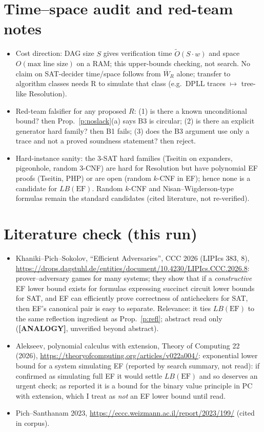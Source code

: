 \documentclass[11pt]{article}
\theoremstyle{remark}
\newcommand{\status}[1]{\textbf{[#1]}}
\newcommand{\W}{\overline W}
\begin{document}
\section{Time--space audit and red-team notes}
\begin{itemize}
\item Cost direction: DAG size $S$ gives verification time $\widetilde O(S\cdot w)$ and space $O(\text{max line size})$ on a RAM; this upper-bounds checking, not search. No claim on SAT-decider time/space follows from $\W_R$ alone; transfer to algorithm classes needs R to simulate that class (e.g.\ DPLL traces $\mapsto$ tree-like Resolution).
\item Red-team falsifier for any proposed $R$: (1) is there a known unconditional bound? then Prop.~\ref{p:noslack}(a) says B3 is circular; (2) is there an explicit generator hard family? then B1 fails; (3) does the B3 argument use only a trace and not a proved soundness statement? then reject.
\item Hard-instance sanity: the 3-SAT hard families (Tseitin on expanders, pigeonhole, random 3-CNF) are hard for Resolution but have polynomial EF proofs (Tseitin, PHP) or are open (random $k$-CNF in EF); hence none is a candidate for $LB(\mathrm{EF})$. Random $k$-CNF and Nisan--Wigderson-type formulas remain the standard candidates (cited literature, not re-verified).
\end{itemize}

\section{Literature check (this run)}
\begin{itemize}
\item Khaniki--Pich--Sokolov, ``Efficient Adversaries'', CCC 2026 (LIPIcs 383, 8), \url{https://drops.dagstuhl.de/entities/document/10.4230/LIPIcs.CCC.2026.8}: prover--adversary games for many systems; they show that if a \emph{constructive} EF lower bound exists for formulas expressing succinct circuit lower bounds for SAT, and EF can efficiently prove correctness of anticheckers for SAT, then EF's canonical pair is easy to separate. Relevance: it ties $LB(\mathrm{EF})$ to the same reflection ingredient as Prop.~\ref{p:refl}; abstract read only (\status{ANALOGY}, unverified beyond abstract).
\item Alekseev, polynomial calculus with extension, Theory of Computing 22 (2026), \url{https://theoryofcomputing.org/articles/v022a004/}: exponential lower bound for a system simulating EF (reported by search summary, not read): if confirmed as simulating full EF it would settle $LB(\mathrm{EF})$ and so deserves an urgent check; as reported it is a bound for the binary value principle in PC with extension, which I treat as \emph{not} an EF lower bound until read.
\item Pich--Santhanam 2023, \url{https://eccc.weizmann.ac.il/report/2023/199/} (cited in corpus).
\end{itemize}
\end{document}
